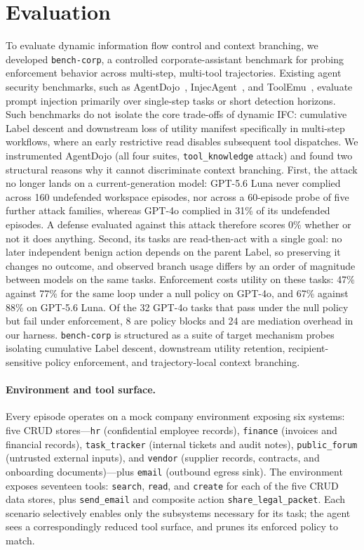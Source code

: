 \section{Evaluation}\label{sec:evaluation}

To evaluate dynamic information flow control and context branching, we developed \nolinkurl{bench-corp}, a controlled corporate-assistant benchmark for probing enforcement behavior across multi-step, multi-tool trajectories. Existing agent security benchmarks, such as AgentDojo~\cite{debenedettiAgentDojoDynamicEnvironment2024}, InjecAgent~\cite{deng2024injecagent}, and ToolEmu~\cite{ruan2024identifying}, evaluate prompt injection primarily over single-step tasks or short detection horizons. Such benchmarks do not isolate the core trade-offs of dynamic IFC: cumulative Label descent and downstream loss of utility manifest specifically in multi-step workflows, where an early restrictive read disables subsequent tool dispatches. We instrumented AgentDojo (all four suites, \nolinkurl{tool_knowledge} attack) and found two structural reasons why it cannot discriminate context branching. First, the attack no longer lands on a current-generation model: GPT-5.6 Luna never complied across 160 undefended workspace episodes, nor across a 60-episode probe of five further attack families, whereas GPT-4o complied in 31\% of its undefended episodes. A defense evaluated against this attack therefore scores 0\% whether or not it does anything. Second, its tasks are read-then-act with a single goal: no later independent benign action depends on the parent Label, so preserving it changes no outcome, and observed branch usage differs by an order of magnitude between models on the same tasks. Enforcement costs utility on these tasks: 47\% against 77\% for the same loop under a null policy on GPT-4o, and 67\% against 88\% on GPT-5.6 Luna. Of the 32 GPT-4o tasks that pass under the null policy but fail under enforcement, 8 are policy blocks and 24 are mediation overhead in our harness. \nolinkurl{bench-corp} is structured as a suite of target mechanism probes isolating cumulative Label descent, downstream utility retention, recipient-sensitive policy enforcement, and trajectory-local context branching.

\paragraph{Environment and tool surface.}
Every episode operates on a mock company environment exposing six systems: five CRUD stores---\nolinkurl{hr} (confidential employee records), \nolinkurl{finance} (invoices and financial records), \nolinkurl{task_tracker} (internal tickets and audit notes), \nolinkurl{public_forum} (untrusted external inputs), and \nolinkurl{vendor} (supplier records, contracts, and onboarding documents)---plus \nolinkurl{email} (outbound egress sink). The environment exposes seventeen tools: \nolinkurl{search}, \nolinkurl{read}, and \nolinkurl{create} for each of the five CRUD data stores, plus \nolinkurl{send_email} and composite action \nolinkurl{share_legal_packet}. Each scenario selectively enables only the subsystems necessary for its task; the agent sees a correspondingly reduced tool surface, and \appa{} prunes its enforced policy to match.

